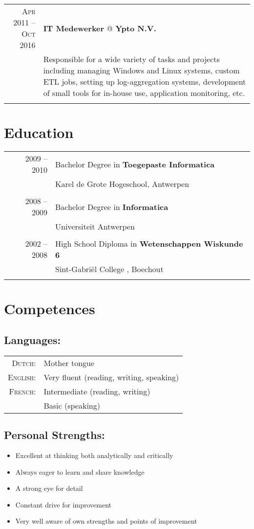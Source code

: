 \documentclass[a4paper,10pt]{article}
\begin{document}
\begin{tabular}{r|p{11cm}}
        
	\textsc{Apr 2011 – Oct 2016} & \textbf{IT Medewerker} @ \textbf{Ypto N.V.} \\
	& \footnotesize{Responsible for a wide variety of tasks and projects including managing Windows and Linux systems, custom ETL jobs, setting up log-aggregation systems, development of small tools for in-house use, application monitoring, etc.} \\
	\multicolumn{2}{c}{} \\
\end{tabular}

\section{\textcolor{awesome-red}{Edu}cation}
\begin{tabular}{rl}	
2009 – 2010& Bachelor Degree in \textbf{Toegepaste Informatica}\\
& Karel de Grote Hogeschool, Antwerpen\\&\\
2008 – 2009& Bachelor Degree in \textbf{Informatica}\\
& Universiteit Antwerpen\\&\\
2002 – 2008& High School Diploma in \textbf{Wetenschappen Wiskunde 6}\\
& Sint-Gabriël College , Boechout\\&\\
\end{tabular}

\section{\textcolor{awesome-red}{Com}petences}

\subsection{Languages:}
\begin{tabular}{rl}
\textsc{Dutch:}&Mother tongue\\
\textsc{English:}&Very fluent (reading, writing, speaking)\\
\textsc{French:}&Intermediate (reading, writing) \\ & Basic (speaking)\\
\end{tabular}

\subsection{Personal Strengths:}
\begin{itemize}
\item Excellent at thinking both analytically and critically
\item Always eager to learn and share knowledge
\item A strong eye for detail
\item Constant drive for improvement
\item Very well aware of own strengths and points of improvement
\end{itemize}
\end{document}
